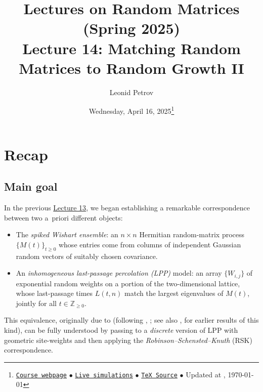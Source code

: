 \documentclass[letterpaper,11pt,oneside,reqno]{article}
\numberwithin{equation}{section}
\theoremstyle{definition}
\begin{document}
\title{Lectures on Random Matrices
(Spring 2025)
\\Lecture 14: Matching Random Matrices to Random Growth II}


\date{Wednesday, April 16, 2025\footnote{\href{https://lpetrov.cc/rmt25/}{\texttt{Course webpage}}
$\bullet$ \href{https://lpetrov.cc/simulations/model/random-matrices/}{\texttt{Live simulations}}
$\bullet$ \href{https://lpetrov.cc/rmt25/rmt25-notes/rmt2025-l14.tex}{\texttt{TeX Source}}
$\bullet$
Updated at \currenttime, \today}}



\author{Leonid Petrov}


\maketitle
\tableofcontents



\section{Recap}

\subsection{Main goal}

In the previous
\href{https://lpetrov.cc/rmt25/rmt25-notes/rmt2025-l13.pdf}{Lecture 13}, we began establishing a remarkable correspondence between two a~priori different objects:

\begin{itemize}
\item The \emph{spiked Wishart ensemble}: an $n\times n$ Hermitian random-matrix process $\{M(t)\}_{t\ge0}$ whose entries come from columns of independent Gaussian random vectors of suitably chosen covariance.
\item An \emph{inhomogeneous last-passage percolation (LPP)} model: an array $\{W_{i,j}\}$ of exponential random weights on a portion of the two-dimensional lattice, whose last-passage times $L(t,n)$ match the largest eigenvalues of $M(t)$, jointly for all $t\in \mathbb{Z}_{\ge0}$.
\end{itemize}

This equivalence, originally due to
\cite{dieker2008largest} (following
\cite{defosseux2010orbit}, \cite{forrester2006jacobians};
see also
\cite{Baryshnikov_GUE2001},
\cite{johansson2000shape} for earlier results of this kind),
can be fully understood by passing to a
\emph{discrete} version of LPP with geometric site-weights
and then applying the \emph{Robinson--Schensted--Knuth}
(RSK) correspondence.
\end{document}

